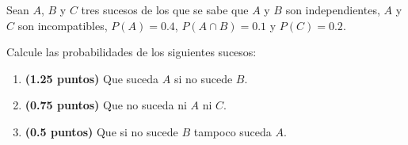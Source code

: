 
Sean $A$, $B$ y $C$ tres sucesos de los que se sabe que $A$ y $B$ son independientes, $A$ y $C$ son incompatibles, $P(A)=0.4$, $P(A\cap B)=0.1$ y $P(C)=0.2$.

Calcule las probabilidades de los siguientes sucesos:
\begin{enumerate}[label=\alph*)]
\item \textbf{(1.25 puntos)} Que suceda $A$ si no sucede $B$.
\item \textbf{(0.75 puntos)} Que no suceda ni $A$ ni $C$.
\item \textbf{(0.5 puntos)} Que si no sucede $B$ tampoco suceda $A$.
\end{enumerate}
